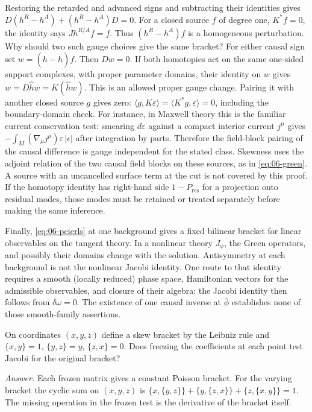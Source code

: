 Restoring the retarded and advanced signs and subtracting their identities gives
$D(h^R-h^A)+(h^R-h^A)D=0$. For a closed source $f$ of degree one,
$K^*f=0$, the identity says $Jh^{R/A}f=f$. Thus
$(h^R-h^A)f$ is a homogeneous perturbation. Why should two such gauge choices
give the same bracket? For either causal sign set $w=(h-\widehat h)f$.
Then $Dw=0$. If both homotopies act on the same one-sided support complexes,
with proper parameter domains, their identity on $w$ gives
$w=D\widehat h w=K(\widehat h w)$. This is an allowed proper gauge change.
Pairing it with another closed source $g$ gives zero:
$\langle g,K\varepsilon\rangle=\langle K^*g,\varepsilon\rangle=0$, including
the boundary-domain check. For instance, in Maxwell theory this is the
familiar current conservation test: smearing $d\varepsilon$ against a
compact interior current $j^\mu$ gives
$-\int_M(\nabla_\mu j^\mu)\varepsilon\,|\epsilon|$ after integration by parts.
Therefore the field-block pairing of the causal difference is gauge
independent for the stated class. Skewness uses the adjoint relation of the
two causal field blocks on these sources, as in \eqref{eq:06-green}. A source
with an uncancelled surface term at the cut is not covered by this proof.
If the homotopy identity has right-hand side $1-P_{\mathrm{res}}$ for a
projection onto residual modes, those modes must be retained or treated
separately before making the same inference.

Finally, \eqref{eq:06-peierls} at one background gives a fixed bilinear
bracket for linear observables on the tangent theory. In a nonlinear theory
$J_\phi$, the Green operators, and possibly their domains change with the
solution. Antisymmetry at each background is not the nonlinear Jacobi
identity. One route to that identity requires a smooth (locally reduced)
phase space, Hamiltonian vectors for the admissible observables, and closure
of their algebra: the Jacobi identity then follows from $\delta\omega=0$.
The existence of one causal inverse at $\bar\phi$ establishes none of those
smooth-family assertions.

\begin{exercise}
On coordinates $(x,y,z)$ define a skew bracket by the Leibniz rule and
$\{x,y\}=1$, $\{y,z\}=y$, $\{z,x\}=0$. Does freezing the coefficients at
each point test Jacobi for the original bracket?
\end{exercise}
\noindent\emph{Answer.} Each frozen matrix gives a constant Poisson bracket.
For the varying bracket the cyclic sum on $(x,y,z)$ is
$\{x,\{y,z\}\}+\{y,\{z,x\}\}+\{z,\{x,y\}\}=1$. The missing operation in
the frozen test is the derivative of the bracket itself.

